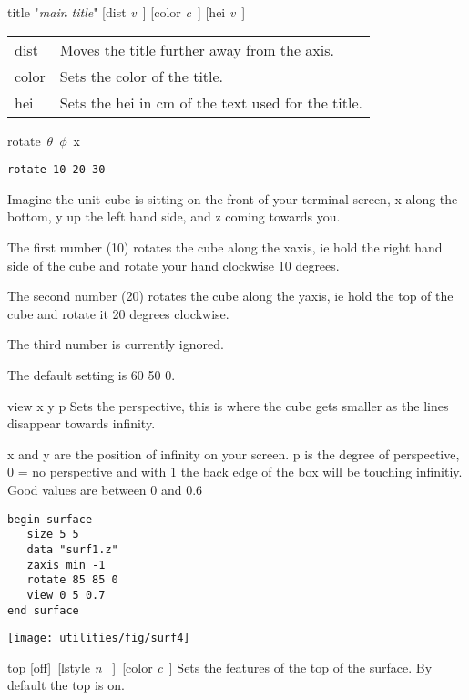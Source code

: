\begin{commanddescription}
\item[{\sf title "{\it main title}"  [dist {\it v}\ ] [color {\it c}\ ] 
[hei {\it v}\ ] }]

\begin{tabular}{ll}	
dist   & Moves the title further away from the axis.\\
color  & Sets the color of the title.\\
hei    & Sets the hei in cm of the text used for the title.\\
\end{tabular}

\item[{\sf rotate\  $\theta$\  $\phi$\  x }]
\begin{verbatim}
rotate 10 20 30
\end{verbatim}
Imagine the unit cube is sitting on the front of your
terminal screen, x along the bottom, y up the left hand
side, and z coming towards you.

The first number (10) rotates the cube along the xaxis, ie
hold the right hand side of the cube and rotate your hand
clockwise 10 degrees.

The second number (20) rotates the cube along the yaxis, ie
hold the top of the cube and rotate it 20 degrees clockwise.

The third number is currently ignored.

The default setting is 60 50 0.

\item[{\sf view x y p }]
Sets the perspective, this is where the cube gets smaller
as the lines disappear towards infinity.

x and y are the position of infinity on your screen.
p is the degree of perspective, 0 = no perspective
and with 1 the back edge of the box will be touching
infinitiy.  Good values are between 0 and 0.6

\begin{minipage}[c]{8cm}
\begin{Verbatim}
begin surface
   size 5 5
   data "surf1.z"
   zaxis min -1
   rotate 85 85 0
   view 0 5 0.7
end surface
\end{Verbatim}
\end{minipage}
\hfill
\begin{minipage}[c]{7cm}
\mbox{\texttt{[image: utilities/fig/surf4]}}
\end{minipage}

\item[{\sf top [off]\ [lstyle {\it n} \ ]\ [color {\it c}\ ] }]
Sets the features of the top of the surface.
By default the top is on.


\end{commanddescription}
